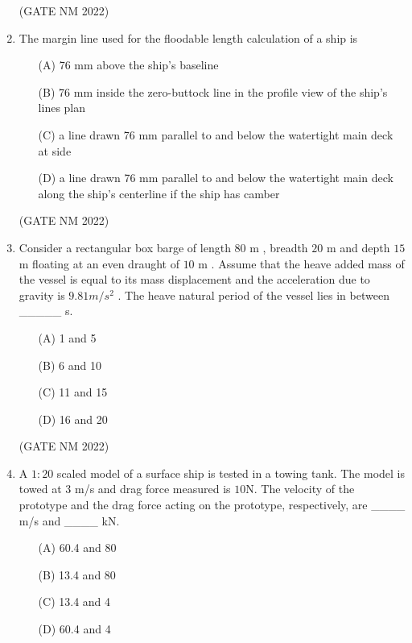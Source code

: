\documentclass[journal,12pt,onecolumn]{IEEEtran}
\theoremstyle{remark}
\begin{document}
\begin{enumerate}
\hfill (GATE NM 2022)







\item  The margin line used for the floodable length calculation of a ship is

\begin{enumerate}
    \item[(A)] 76 mm above the ship's baseline
    \item[(B)] 76 mm inside the zero-buttock line in the profile view of the ship's lines plan
    \item[(C)] a line drawn 76 mm parallel to and below the watertight main deck at side
    \item[(D)] a line drawn 76 mm parallel to and below the watertight main deck along the ship's centerline if the ship has camber
\end{enumerate}

\hfill (GATE NM 2022)





\item  Consider a rectangular box barge of length $80$ m , breadth $20$ m  and depth $15$ m  floating at an even draught of $10$ m . Assume that the heave added mass of the vessel is equal to its mass displacement and the acceleration due to gravity is $9.81  m/s^2 $ . The heave natural period of the vessel lies in between \_\_\_\_\_  s.

\begin{enumerate}
    \item[(A)] 1 and 5
    \item[(B)] 6 and 10
    \item[(C)] 11 and 15
    \item[(D)] 16 and 20
\end{enumerate}

\hfill(GATE NM 2022)





\item  A $1{:}20$ scaled model of a surface ship is tested in a towing tank. The model is towed at 3 m/s  and drag force measured is $10$N. The velocity of the prototype and the drag force acting on the prototype, respectively, are \_\_\_\_   m/s and \_\_\_\_   kN.

\begin{enumerate}
    \item[(A)] 60.4 and 80
    \item[(B)] 13.4 and 80
    \item[(C)] 13.4 and 4
    \item[(D)] 60.4 and 4
\end{enumerate}


\end{enumerate}
\end{document}
